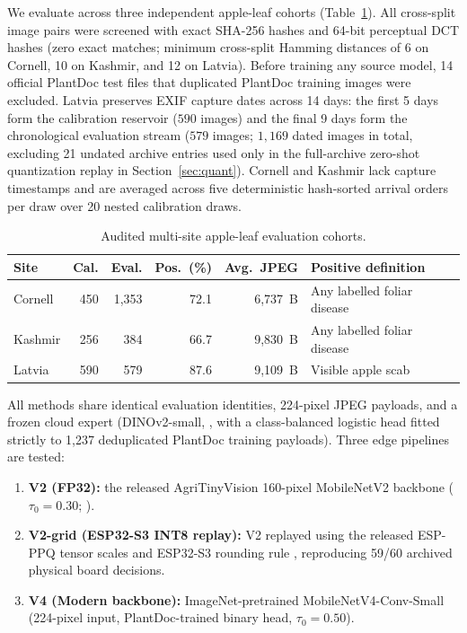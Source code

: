 \documentclass[preprint,12pt,authoryear]{elsarticle}
\begin{document}
We evaluate across three independent apple-leaf cohorts (Table~\ref{tab:cohorts}). All cross-split image pairs were screened with exact SHA-256 hashes and 64-bit perceptual DCT hashes (zero exact matches; minimum cross-split Hamming distances of 6 on Cornell, 10 on Kashmir, and 12 on Latvia). Before training any source model, 14 official PlantDoc test files that duplicated PlantDoc training images were excluded. Latvia preserves EXIF capture dates across 14 days: the first 5 days form the calibration reservoir ($590$ images) and the final 9 days form the chronological evaluation stream ($579$ images; $1{,}169$ dated images in total, excluding 21 undated archive entries used only in the full-archive zero-shot quantization replay in Section~\ref{sec:quant}). Cornell and Kashmir lack capture timestamps and are averaged across five deterministic hash-sorted arrival orders per draw over 20 nested calibration draws.

\begin{table}[t]
\centering
\caption{Audited multi-site apple-leaf evaluation cohorts.}
\label{tab:cohorts}
\small
\begin{tabular}{@{}lrrrrl@{}}
\toprule
Site & Cal. & Eval. & Pos.\ (\%) & Avg.\ JPEG & Positive definition \\
\midrule
Cornell \citep{cornell} & 450 & 1,353 & 72.1 & 6,737~B & Any labelled foliar disease \\
Kashmir \citep{kashmir} & 256 & 384 & 66.7 & 9,830~B & Any labelled foliar disease \\
Latvia \citep{latvia}   & 590 & 579 & 87.6 & 9,109~B & Visible apple scab \\
\bottomrule
\end{tabular}
\end{table}

All methods share identical evaluation identities, 224-pixel JPEG payloads, and a frozen cloud expert (DINOv2-small, \citealp{dino}, with a class-balanced logistic head fitted strictly to 1,237 deduplicated PlantDoc training payloads). Three edge pipelines are tested:
\begin{enumerate}
  \item \textbf{V2 (FP32):} the released AgriTinyVision 160-pixel MobileNetV2 backbone ($\tau_0 = 0.30$; \citealp{agri}).
  \item \textbf{V2-grid (ESP32-S3 INT8 replay):} V2 replayed using the released ESP-PPQ tensor scales and ESP32-S3 rounding rule \citep{espdl}, reproducing 59/60 archived physical board decisions.
  \item \textbf{V4 (Modern backbone):} ImageNet-pretrained MobileNetV4-Conv-Small \citep{mobilenetv4} (224-pixel input, PlantDoc-trained binary head, $\tau_0 = 0.50$).
\end{enumerate}
\end{document}
